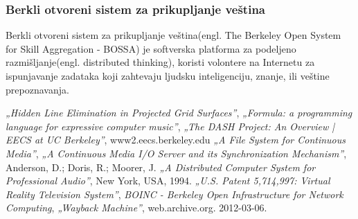 \documentclass[titlepage, 12pt]{article}
\begin{document}
\subsubsection{Berkli otvoreni sistem za prikupljanje veština}
Berkli otvoreni sistem za prikupljanje veština(engl. The Berkeley Open System for Skill Aggregation - BOSSA) je softverska platforma za podeljeno razmišljanje(engl. distributed thinking), koristi volontere na Internetu za ispunjavanje zadataka koji zahtevaju ljudsku inteligenciju, znanje, ili veštine prepoznavanja.

\newpage
\begin{thebibliography}{9}
  
  \textit{„Hidden Line Elimination in Projected Grid Surfaces”},
    \textit{„Formula: a programming language for expressive computer music”},
    \textit{ „The DASH Project: An Overview | EECS at UC Berkeley”},
    www2.eecs.berkeley.edu
    \textit{ „A File System for Continuous Media”},
    \textit{„A Continuous Media I/O Server and its Synchronization Mechanism”},
    Anderson, D.; Doris, R.; Moorer, J.
    \textit{ „A Distributed Computer System for Professional Audio”},
    New York, USA,
    1994.
    \textit{„U.S. Patent 5,714,997: Virtual Reality Television System”},
    \textit{BOINC - Berkeley Open Infrastructure for Network Computing},
    \textit{ „Wayback Machine”},
    web.archive.org. 2012-03-06. 
\end{thebibliography}
\end{document}
